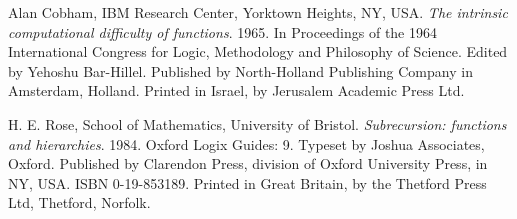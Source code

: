 \begin{thebibliography}{9} %


Alan Cobham, IBM Research Center, Yorktown Heights, NY, USA. \emph{The
intrinsic computational difficulty of functions}. 1965. In Proceedings of the
1964 International Congress for Logic, Methodology and Philosophy of Science.
Edited by Yehoshu Bar-Hillel. Published by North-Holland Publishing Company in
Amsterdam, Holland.  Printed in Israel, by Jerusalem Academic Press Ltd.


H. E. Rose, School of Mathematics, University of Bristol. \emph{Subrecursion:
functions and hierarchies}. 1984. Oxford Logix Guides: 9. Typeset by Joshua
Associates, Oxford.  Published by Clarendon Press, division of Oxford
University Press, in NY, USA. ISBN 0-19-853189. Printed in Great Britain, by
the Thetford Press Ltd, Thetford, Norfolk.

\end{thebibliography}
